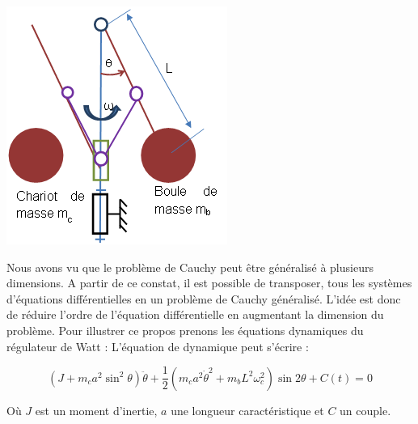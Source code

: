 \documentclass[10pt,fleqn]{article} %
\begin{document}
\begin{minipage}[c]{.25\linewidth}
\begin{center}
\includegraphics[width=.95\textwidth]{images/fig_13}
\end{center}
\end{minipage}
\hfill
\begin{minipage}[c]{.7\linewidth}
Nous avons vu que le problème de Cauchy peut être généralisé à plusieurs dimensions. A partir de ce constat, il est possible de transposer, tous les systèmes d’équations différentielles en un problème de Cauchy généralisé. L’idée est donc de réduire l’ordre de l’équation différentielle en augmentant la dimension du problème.
Pour illustrer ce propos prenons les équations dynamiques du régulateur de Watt :
L’équation de dynamique peut s’écrire :

$$(J+m_c a^2  \sin^2 \theta ) \ddot{\theta}+\dfrac{1}{2} (m_c a^2 \dot{\theta}^2+m_b L^2 \omega_c^2 ) \sin 2\theta +C(t)=0$$

Où $J$ est un moment d’inertie, $a$ une longueur caractéristique et $C$ un couple.
\end{minipage}
\end{document}
